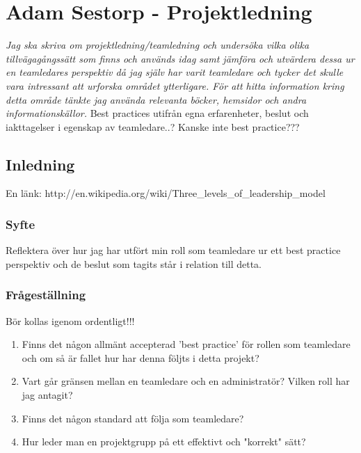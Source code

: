 \section{Adam Sestorp - Projektledning}
\emph{Jag ska skriva om projektledning/teamledning och undersöka vilka olika tillvägagångssätt som finns och används idag samt jämföra och utvärdera dessa ur en teamledares perspektiv då jag själv har varit teamledare och tycker det skulle vara intressant att urforska området ytterligare. 
\newline \newline
För att hitta information kring detta område tänkte jag använda relevanta böcker, hemsidor och andra informationskällor.}
\newline \newline
Best practices utifrån egna erfarenheter, beslut och iakttagelser i egenskap av teamledare..?
\newline \newline
Kanske inte best practice???

\subsection{Inledning}
En länk: http://en.wikipedia.org/wiki/Three_levels_of_leadership_model

\subsubsection{Syfte}
Reflektera över hur jag har utfört min roll som teamledare ur ett best practice perspektiv och de beslut som tagits står i relation till detta.

\subsubsection{Frågeställning}
Bör kollas igenom ordentligt!!!
	\begin{enumerate}
		\item Finns det någon allmänt accepterad 'best practice' för rollen som teamledare och om så är fallet hur har denna följts i detta projekt?
		\item Vart går gränsen mellan en teamledare och en administratör? Vilken roll har jag antagit?
		\item Finns det någon standard att följa som teamledare?
		\item Hur leder man en projektgrupp på ett effektivt och "korrekt" sätt?
	\end{enumerate}
